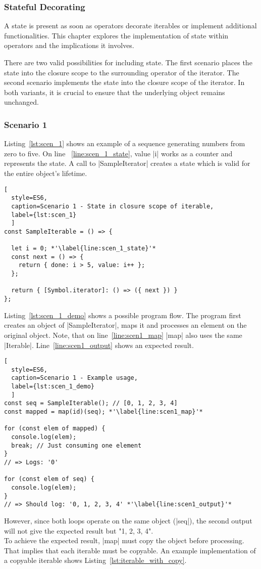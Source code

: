 \subsubsection{Stateful Decorating}
\label{subsub:Stateful Decorating}
A state is present as soon as operators decorate iterables or implement 
additional functionalities. This chapter explores the implementation of state
within operators and the implications it involves.

There are two valid possibilities for including state.
The first scenario places the state into the closure scope to the surrounding 
operator of the iterator. The second scenario implements the state into the 
closure scope of the iterator. In both variants, it is crucial to ensure that 
the underlying object remains unchanged.

\subsubsection{Scenario 1}
\label{subsub:Scenario 1}
Listing~\ref{lst:scen_1} shows an example of a sequence generating numbers from
zero to five. On line ~\ref{line:scen_1_state}, value |i| works as a counter 
and represents the state. 
A call to |SampleIterator| creates a state which is valid for the entire 
object's lifetime.

\begin{lstlisting}[
  style=ES6, 
  caption=Scenario 1 - State in closure scope of iterable,
  label={lst:scen_1}
  ]
const SampleIterable = () => {

  let i = 0; *'\label{line:scen_1_state}'*
  const next = () => {
    return { done: i > 5, value: i++ };
  };

  return { [Symbol.iterator]: () => ({ next }) }
};
\end{lstlisting}

Listing~\ref{lst:scen_1_demo} shows a possible program flow. The program first
creates an object of |SampleIterator|, maps it and processes an element on the
original object. Note, that on line~\ref{line:scen1_map} |map| also uses the
same |Iterable|. Line~\ref{line:scen1_output} shows an expected result.

\begin{lstlisting}[
  style=ES6, 
  caption=Scenario 1 - Example usage,
  label={lst:scen_1_demo}
  ]
const seq = SampleIterable(); // [0, 1, 2, 3, 4]
const mapped = map(id)(seq); *'\label{line:scen1_map}'*

for (const elem of mapped) {
  console.log(elem);
  break; // Just consuming one element
}
// => Logs: '0'

for (const elem of seq) {
  console.log(elem);
}
// => Should log: '0, 1, 2, 3, 4' *'\label{line:scen1_output}'*
\end{lstlisting}
However, since both loops operate on the same object (|seq|), the second output
will not give the expected result but "1, 2, 3, 4".\\
To achieve the expected result, |map| must copy the object before processing.
That implies that each iterable must be copyable. An example implementation
of a copyable iterable shows Listing~\ref{lst:iterable_with_copy}.

